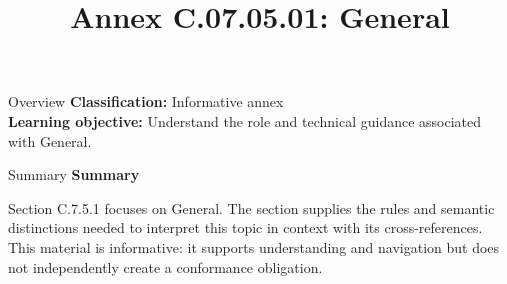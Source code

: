 \documentclass[10pt,letterpaper]{article}
\title{Annex C.07.05.01: General}
\author{}
\date{}
\begin{document}
\maketitle
\begin{CornellOverviewBox}{Overview}
\textbf{Classification:} Informative annex\\[2pt]
\textbf{Learning objective:} Understand the role and technical guidance associated with General.
\end{CornellOverviewBox}\begin{CornellSummaryBox}{Summary}
{\sffamily\bfseries\color{Accent} Summary}\par\vspace{3pt}Section C.7.5.1 focuses on General. The section supplies the rules and semantic distinctions needed to interpret this topic in context with its cross-references. This material is informative: it supports understanding and navigation but does not independently create a conformance obligation.
\end{CornellSummaryBox}
\end{document}
